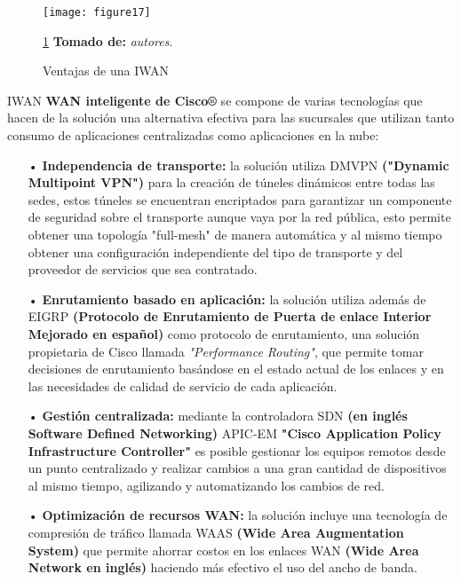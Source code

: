 \begin{figure}[htbp]
  \centering
    {\texttt{[image: figure17]}}%
  \caption{\footnotesize{Ventajas de una IWAN}}
  \ref{fig:iwan} \textbf{Tomado de:} \textit{autores}.
  \label{fig:iwan}
\end{figure}
IWAN \textbf{WAN inteligente de Cisco®} se compone de varias tecnologías que hacen de la solución una alternativa efectiva para las sucursales que utilizan tanto consumo de aplicaciones centralizadas como aplicaciones en la nube:
\begin{itemize}
\item[•]\textbf{Independencia de transporte:} la solución utiliza DMVPN \textbf{("Dynamic Multipoint VPN")} para la creación de túneles dinámicos entre todas las sedes, estos túneles se encuentran encriptados para garantizar un componente de seguridad sobre el transporte aunque vaya por la red pública, esto permite obtener una topología "full-mesh" de manera automática y al mismo tiempo obtener una configuración independiente del tipo de transporte y del proveedor de servicios que sea contratado.
\item[•]\textbf{Enrutamiento basado en aplicación:} la solución utiliza además de EIGRP \textbf{(Protocolo de Enrutamiento de Puerta de enlace Interior Mejorado en español)} como protocolo de enrutamiento, una solución propietaria de Cisco llamada  \textit{"Performance Routing"}, que permite tomar decisiones de enrutamiento basándose en el estado actual de los enlaces y en las necesidades de calidad de servicio de cada aplicación.
\item[•]\textbf{Gestión centralizada:} mediante la controladora SDN \textbf{(en inglés Software Defined Networking)} APIC-EM \textbf{"Cisco Application Policy Infrastructure Controller"} es posible gestionar los equipos remotos desde un punto centralizado y realizar cambios a una gran cantidad de dispositivos al mismo tiempo, agilizando y automatizando los cambios de red.
\item[•]\textbf{Optimización de recursos WAN:} la solución incluye una tecnología de compresión de tráfico llamada WAAS \textbf{(Wide Area Augmentation System)} que permite ahorrar costos en los enlaces WAN \textbf{(Wide Area Network en inglés)} haciendo más efectivo el uso del ancho de banda.
\end{itemize}

